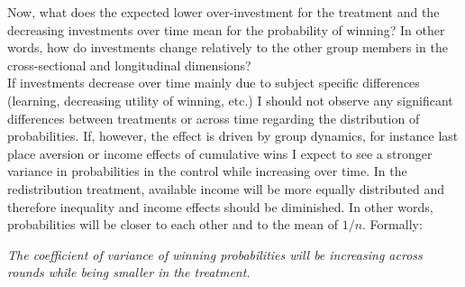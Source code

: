    Now, what does the expected lower over-investment for the treatment and the decreasing investments over time mean for the probability of winning? In other words, how do investments change relatively to the other group members in the cross-sectional and longitudinal dimensions?\\
    
    If investments decrease over time mainly due to subject specific differences (learning, decreasing utility of winning, etc.) I should not observe any significant differences between treatments or across time regarding the distribution of probabilities. If, however, the effect is driven by group dynamics, for instance last place aversion or income effects of cumulative wins I expect to see a stronger variance in probabilities in the control while increasing over time. In the redistribution treatment, available income will be more equally distributed and therefore inequality and income effects should be diminished. In other words, probabilities will be closer to each other and to the mean of $1/n$. Formally:
    
    \begin{hyp}\label{hyp:wins}
    \textit{The coefficient of variance of winning probabilities will be increasing across rounds while being smaller in the treatment.}
    \end{hyp}
    
 
